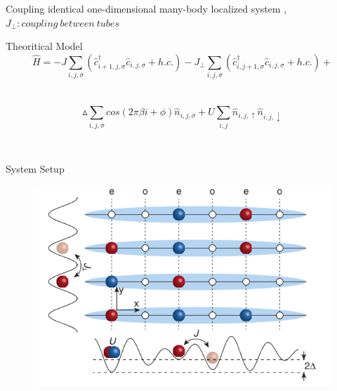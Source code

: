 \documentclass{beamer}
\begin{document}
\begin{frame}
Coupling identical one-dimensional many-body localized system ,$J_{\perp}:coupling\ between\ tubes$
\begin{block}{Theoritical Model}
$$\hat{H}=-J\sum_{i,j,\sigma}(\hat{c}_{i+1,j,\sigma}^{\dagger}\hat{c}_{i,j,\sigma}+h.c.)-J_{\perp}\sum_{i,j,\sigma}(\hat{c}_{i,j+1,\sigma}^{\dagger}\hat{c}_{i,j,\sigma}+h.c.)+$$\\~
$$\vartriangle \sum_{i,j,\sigma}cos(2\pi\beta i+\phi)\hat{n}_{i,j,\sigma}+U\sum_{i,j}\hat{n}_{i,j,\uparrow}\hat{n}_{i,j,\downarrow}$$
\end{block}
~\\
\end{frame}

\begin{frame}{System Setup}
\begin{figure}
\includegraphics[width=0.8\linewidth]{coupling1}
\end{figure}
\end{frame}
\end{document}
